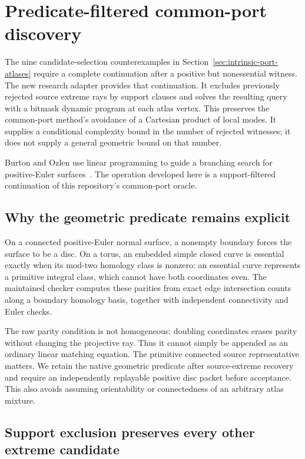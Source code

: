 \section{Predicate-filtered common-port discovery}
\label{sec:predicate-filtered-atlases}

The nine candidate-selection counterexamples in
Section~\ref{sec:intrinsic-port-atlases} require a complete continuation
after a positive but nonessential witness.  The new research adapter
 provides that continuation.
It excludes previously rejected source extreme rays by support clauses
and solves the resulting query with a bitmask dynamic program at each
atlas vertex.  This preserves the common-port method's avoidance of a
Cartesian product of local modes.  It supplies a conditional complexity
bound in the number of rejected witnesses; it does not supply a general
geometric bound on that number.

Burton and Ozlen use linear programming to guide a branching search
for positive-Euler surfaces~\cite{burton-ozlen}.  The operation developed here is a
support-filtered continuation of this repository's common-port oracle.

\subsection{Why the geometric predicate remains explicit}

On a connected positive-Euler normal surface, a nonempty boundary forces
the surface to be a disc.  On a torus, an embedded simple closed curve
is essential exactly when its mod-two homology class is nonzero: an
essential curve represents a primitive integral class, which cannot
have both coordinates even.  The maintained checker computes these
parities from exact edge intersection counts along a boundary homology
basis, together with independent connectivity and Euler checks.

The raw parity condition is not homogeneous: doubling coordinates
erases parity without changing the projective ray.  Thus it cannot
simply be appended as an ordinary linear matching equation.  The
primitive connected source representative matters.  We retain the
native geometric predicate after source-extreme recovery and require
an independently replayable positive disc packet before acceptance.
This also avoids assuming orientability or connectedness of an
arbitrary atlas mixture.

\subsection{Support exclusion preserves every other extreme candidate}


